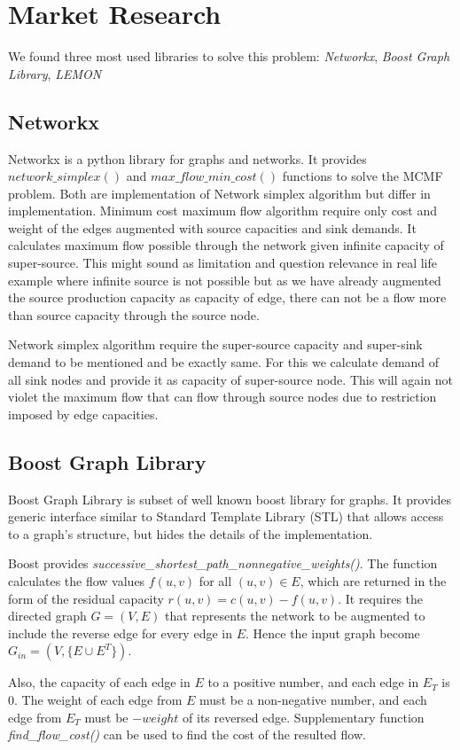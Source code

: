 \documentclass{article}
\begin{document}
\section{Market Research}
We found three most used libraries to solve this problem: \emph{Networkx}, \emph{Boost Graph Library}, \emph{LEMON}
\subsection{Networkx}
Networkx is a python library for graphs and networks. It provides $network\_simplex()$ and $max\_flow\_min\_cost()$ functions to solve the MCMF problem. Both are implementation of Network simplex algorithm \cite{kiraly2012efficient} but differ in implementation. Minimum cost maximum flow algorithm require only cost and weight of the edges augmented with source capacities and sink demands. It calculates maximum flow possible through the network given infinite capacity of super-source. This might sound as limitation and question relevance in real life example where infinite source is not possible but as we have already augmented the source production capacity as capacity of edge, there can not be a flow more than source capacity through the source node. 

Network simplex algorithm require the super-source capacity and super-sink demand to be mentioned and be exactly same. For this we calculate demand of all sink nodes and provide it as capacity of super-source node. This will again not violet the maximum flow that can flow through source nodes due to restriction imposed by edge capacities.
\subsection{Boost Graph Library}
Boost Graph Library is subset of well known boost library for graphs. It provides generic interface similar to Standard Template Library (STL) that allows access to a graph's structure, but hides the details of the implementation. 


Boost provides \emph{successive\_shortest\_path\_nonnegative\_weights()}.
The function calculates the flow values $f(u,v)$ for all $(u,v) \in E$, which are returned in the form of the residual capacity $r(u,v) = c(u,v) - f(u,v)$. It requires the directed graph $G=(V,E)$ that represents the network to be augmented to include the reverse edge for every edge in $E$. Hence the input graph become $G_{in} = (V,\{E \cup E^{T}\})$. 

Also, the capacity of each edge in $E$ to a positive number, and each edge in $E_T$ is $0$. The weight of each edge from $E$ must be a non-negative number, and each edge from $E_T$ must be $-weight$ of its reversed edge. Supplementary function \emph{find\_flow\_cost()} can be used to find the cost of the resulted flow.
\end{document}
